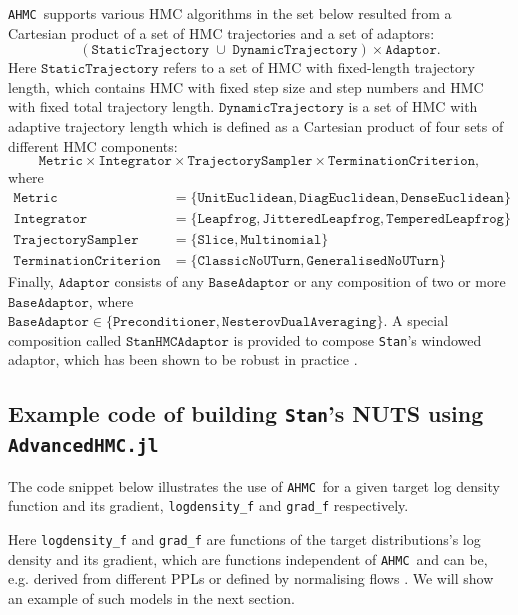 \documentclass[tablecaption=bottom,wcp]{jmlr} %
\def\ahmc{\texttt{AHMC}}
\def\ahmcfull{\texttt{AdvancedHMC.jl}}
\def\stan{\texttt{Stan}}
\begin{document}
\ahmc~supports various HMC algorithms in the set below resulted from a Cartesian product of a set of HMC trajectories and a set of adaptors:
$$
(\texttt{StaticTrajectory}\; \cup\; \texttt{DynamicTrajectory}) \times \texttt{Adaptor}.
$$
Here $\texttt{StaticTrajectory}$ refers to a set of HMC with fixed-length trajectory length, which contains HMC with fixed step size and step numbers and HMC with fixed total trajectory length. $\texttt{DynamicTrajectory}$ is a set of HMC with adaptive trajectory length 
which is defined as a Cartesian product of four sets of different HMC components:
$$
\texttt{Metric} \times \texttt{Integrator} \times \texttt{TrajectorySampler} \times \texttt{TerminationCriterion},
$$
where 
\begin{align*} 
    \texttt{Metric} &=  \{ \texttt{UnitEuclidean}, \texttt{DiagEuclidean}, \texttt{DenseEuclidean} \} \\ 
    \texttt{Integrator} &=  \{ \texttt{Leapfrog}, \texttt{JitteredLeapfrog}, \texttt{TemperedLeapfrog} \} \\
    \texttt{TrajectorySampler} &=  \{ \texttt{Slice}, \texttt{Multinomial} \} \\
    \texttt{TerminationCriterion} &= \{ \texttt{ClassicNoUTurn}, \texttt{GeneralisedNoUTurn} \}
\end{align*}
Finally, $\texttt{Adaptor}$ consists of any $\texttt{BaseAdaptor}$ or any composition of two or more $\texttt{BaseAdaptor}$, where $\texttt{BaseAdaptor} \in \{\texttt{Preconditioner}, \texttt{NesterovDualAveraging}\}$.
A special composition called $\texttt{StanHMCAdaptor}$ is provided to compose \stan's windowed adaptor, which has been shown to be robust in practice 
\citep{carpenter2017stan}.

\subsection{Example code of building \stan's NUTS using \ahmcfull}
The code snippet below illustrates the use of \ahmc~for a given target log density function and its gradient, \texttt{logdensity\_f} and \texttt{grad\_f} respectively.

Here \texttt{logdensity\_f} and \texttt{grad\_f} are functions of the target distributions's log density and its gradient, which are functions independent of \ahmc~and can be, e.g. derived from different PPLs or defined by normalising flows \citep{Rezende2015-yo,dinh2016density,papamakarios2017masked}. We will show an example of such models in the next section.
\end{document}
